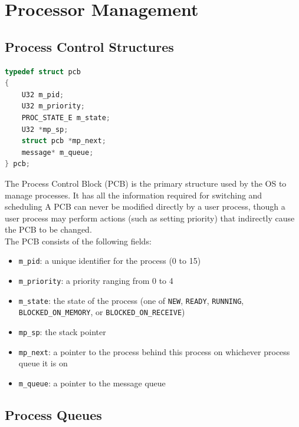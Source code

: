 \documentclass[12pt]{report}
\begin{document}
\pagebreak



\section{Processor Management}

\subsection{Process Control Structures}

\begin{minipage}{\textwidth}
\begin{lstlisting}[language=C, frame=single]
typedef struct pcb 
{ 
	U32 m_pid;
	U32 m_priority;
	PROC_STATE_E m_state;
	U32 *mp_sp;
	struct pcb *mp_next;  
	message* m_queue;
} pcb;
\end{lstlisting}
\end{minipage}

The Process Control Block (PCB) is the primary structure used by the OS to manage processes. It has all the information required for switching and scheduling A PCB can never be modified directly by a user process, though a user process may perform actions (such as setting priority) that indirectly cause the PCB to be changed.\\

The PCB consists of the following fields:

\begin{itemize}
\item \texttt{m_pid}: a unique identifier for the process (0 to 15)
\item \texttt{m_priority}: a priority ranging from 0 to 4
\item \texttt{m_state}: the state of the process (one of {\tt NEW}, {\tt READY}, {\tt RUNNING}, {\tt BLOCKED\_ON\_MEMORY}, or {\tt BLOCKED\_ON\_RECEIVE})
\item \texttt{mp_sp}: the stack pointer
\item \texttt{mp_next}: a pointer to the process behind this process on whichever process queue it is on
\item \texttt{m_queue}: a pointer to the message queue
\end{itemize}

\subsection{Process Queues}
\end{document}
